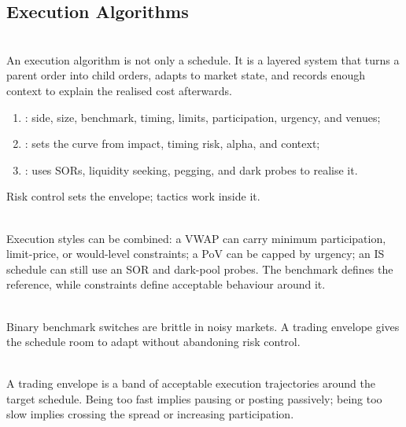 \subsection{Execution Algorithms}

\begin{principle} \\
An execution algorithm is not only a schedule. It is a layered system that turns a parent order into child orders, adapts to market state, and records enough context to explain the realised cost afterwards.
\end{principle}

\begin{taxonomy} 
\begin{enumerate}[label=\roman*.]
\setlength{\itemsep}{0pt}
\item {}: side, size, benchmark, timing, limits, participation, urgency, and venues;
\item {}: sets the curve from impact, timing risk, alpha, and context;
\item {}: uses SORs, liquidity seeking, pegging, and dark probes to realise it.
\end{enumerate}
Risk control sets the envelope; tactics work inside it.
\end{taxonomy}

\begin{principle} \\
Execution styles can be combined: a VWAP can carry minimum participation, limit-price, or would-level constraints; a PoV can be capped by urgency; an IS schedule can still use an SOR and dark-pool probes. The benchmark defines the reference, while constraints define acceptable behaviour around it.
\end{principle}

\begin{caveat} \\
Binary benchmark switches are brittle in noisy markets. A trading envelope gives the schedule room to adapt without abandoning risk control.
\end{caveat}

\begin{definition} \\
A trading envelope is a band of acceptable execution trajectories around the target schedule. Being too fast implies pausing or posting passively; being too slow implies crossing the spread or increasing participation.
\end{definition}

